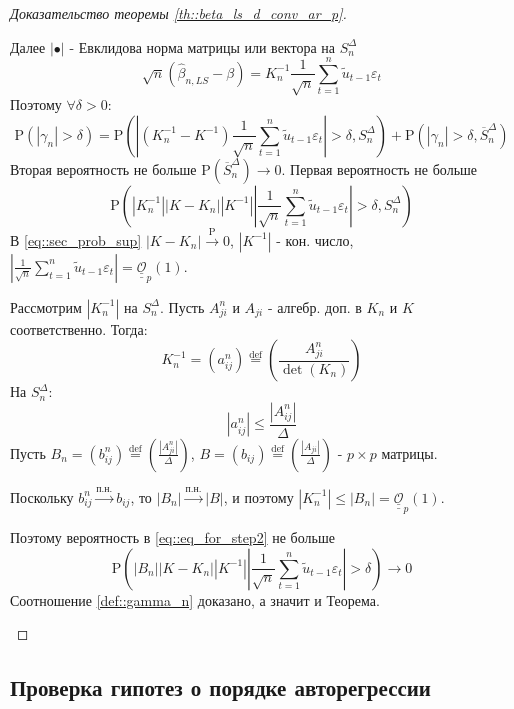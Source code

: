 \documentclass[12pt]{article}
\newcommand*{\defeq}{\stackrel{\text{def}}{=}}
\def\eps{ \varepsilon }
\def\P{ \mathrm{P} }
\def\bigO{ \underline{\underline{\mathcal{O}}} }
\begin{document}
\begin{proof}[Доказательство теоремы \ref{th::beta_ls_d_conv_ar_p}]
\begin{enumerate}
        Далее $\left\lvert \bullet\right\rvert $ - Евклидова норма матрицы или вектора на $S_n^\Delta$
        \[\sqrt{n}(\widehat{\beta}_{n,LS}-\beta)=K^{-1}_n\frac{1}{\sqrt{n}}\sum_{t=1}^n\widetilde{u}_{t-1}\eps_t\]
        Поэтому $\forall\delta>0$:
        \[\P(\left\lvert \gamma_n\right\rvert >\delta)=\P\left(\left\lvert (K^{-1}_n-K^{-1})\frac{1}{\sqrt{n}}\sum_{t=1}^n\widetilde{u}_{t-1}\eps_t\right\rvert >\delta,S_n^\Delta\right)+\P\left(\left\lvert \gamma_n\right\rvert >\delta,\overline{S}_n^\Delta\right)\]
        Вторая вероятность не больше $\P(\overline{S}_n^\Delta)\rightarrow0$. Первая вероятность
        не больше
        \begin{equation} \label{eq::sec_prob_sup}
            \P(\left\lvert K_n^{-1}\right\rvert \left\lvert K-K_n\right\rvert \left\lvert K^{-1}\right\rvert \left\lvert \frac{1}{\sqrt{n}}\sum_{t=1}^n\widetilde{u}_{t-1}\eps_t\right\rvert >\delta, S_n^\Delta)
        \end{equation}
        В \eqref{eq::sec_prob_sup} $\left\lvert K-K_n\right\rvert \xrightarrow{\P}0$, $\left\lvert K^{-1}\right\rvert $ - кон. число, $\left\lvert \frac{1}{\sqrt{n}}\sum_{t=1}^n\widetilde{u}_{t-1}\eps_t\right\rvert =\bigO_p(1)$.

        Рассмотрим $\left\lvert K_n^{-1}\right\rvert $ на $S_n^\Delta$. Пусть $A_{ji}^n$ и $A_{ji}$ - алгебр. доп. в $K_n$ и $K$ соответственно.
        Тогда:
        \[K_n^{-1}=(a_{ij}^n)\defeq\left(\frac{A_{ji}^n}{\det(K_n)}\right)\]
        На $S_n^\Delta$:
        \[\left\lvert a^n_{ij}\right\rvert \leq\frac{\left\lvert A_{ij}^n\right\rvert }{\Delta}\]
        Пусть $B_n=(b_{ij}^n)\defeq\left(\frac{\left\lvert A_{ji}^n\right\rvert }{\Delta}\right)$, $B=(b_{ij})\defeq\left(\frac{\left\lvert A_{ji}\right\rvert }{\Delta}\right)$ - $p\times p$ матрицы.

        Поскольку $b^n_{ij}\xrightarrow{\text{п.н.}}b_{ij}$, то $\left\lvert B_n\right\rvert \xrightarrow{\text{п.н.}}\left\lvert B\right\rvert $,
        и поэтому $\left\lvert K_n^{-1}\right\rvert \leq\left\lvert B_n\right\rvert =\bigO_p(1)$.

        Поэтому вероятность в \eqref{eq::eq_for_step2} не больше
        \[\P(\left\lvert B_n\right\rvert \left\lvert K-K_n\right\rvert \left\lvert K^{-1}\right\rvert \left\lvert \frac{1}{\sqrt{n}}\sum_{t=1}^n\widetilde{u}_{t-1}\eps_t\right\rvert >\delta)\rightarrow0\]
        Соотношение \eqref{def::gamma_n} доказано, а значит и Теорема.
    \end{enumerate}
\end{proof}

\subsection{Проверка гипотез о порядке авторегрессии}
\end{document}
